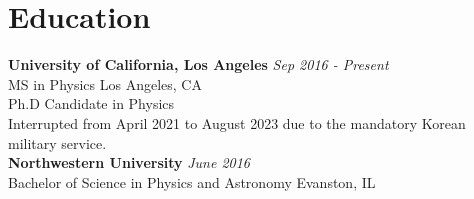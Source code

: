 \section{\mysidestyle Education}
\textbf{University of California, Los Angeles} \hfill \textsl{Sep 2016 - Present}\\
    MS in Physics \hfill Los Angeles, CA\\
    Ph.D Candidate in Physics \hfill\\
  \hspace*{2mm} \textbullet \hspace*{0.5mm} Interrupted from April 2021 to August 2023 due to the mandatory Korean military service.
\vspace{.2mm}\\
\textbf{Northwestern University} \hfill \textsl{June 2016}\\
	Bachelor of Science in Physics and Astronomy \hfill Evanston, IL
